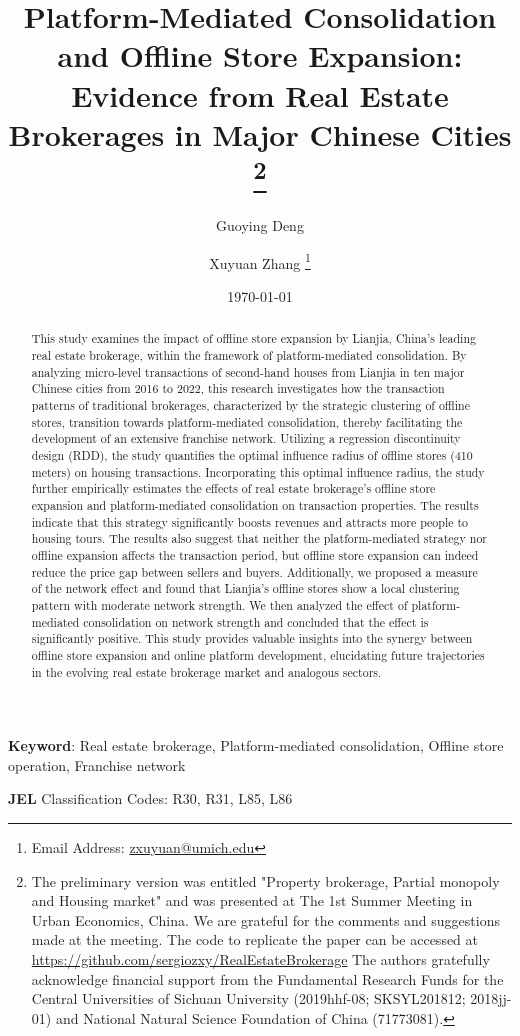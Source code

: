\documentclass[11pt]{article}
\title{ \vspace*{-2.5cm} \hspace*{-0.5cm}Platform-Mediated Consolidation and Offline Store Expansion: Evidence from Real Estate Brokerages in Major Chinese Cities \footnote{
The preliminary version was entitled "Property brokerage, Partial monopoly and Housing market" and was presented at The 1st Summer Meeting in Urban Economics, China. We are grateful for the comments and suggestions made at the meeting. The code to replicate the paper can be accessed at \href{https://github.com/sergiozxy/RealEstateBrokerage}{https://github.com/sergiozxy/RealEstateBrokerage} The authors gratefully acknowledge financial support from the Fundamental Research Funds for the Central Universities of Sichuan University (2019hhf-08; SKSYL201812; 2018jj-01) and National Natural Science Foundation of China (71773081). %
}}
\date{ \vspace*{0.5cm} \today}
\begin{document}
\author[1]{Guoying Deng}
\author[2]{Xuyuan Zhang \thanks{Email Address: \href{mailto:zxuyuan@umich.edu}{zxuyuan@umich.edu}}}

\bgroup
\let\footnoterule\relax

\begin{singlespace}
\maketitle

\begin{abstract}
    \noindent This study examines the impact of offline store expansion by Lianjia, China's leading real estate brokerage, within the framework of platform-mediated consolidation. By analyzing micro-level transactions of second-hand houses from Lianjia in ten major Chinese cities from 2016 to 2022, this research investigates how the transaction patterns of traditional brokerages, characterized by the strategic clustering of offline stores, transition towards platform-mediated consolidation, thereby facilitating the development of an extensive franchise network. Utilizing a regression discontinuity design (RDD), the study quantifies the optimal influence radius of offline stores (410 meters) on housing transactions. Incorporating this optimal influence radius, the study further empirically estimates the effects of real estate brokerage's offline store expansion and platform-mediated consolidation on transaction properties. The results indicate that this strategy significantly boosts revenues and attracts more people to housing tours. The results also suggest that neither the platform-mediated strategy nor offline expansion affects the transaction period, but offline store expansion can indeed reduce the price gap between sellers and buyers. Additionally, we proposed a measure of the network effect and found that Lianjia's offline stores show a local clustering pattern with moderate network strength. We then analyzed the effect of platform-mediated consolidation on network strength and concluded that the effect is significantly positive. This study provides valuable insights into the synergy between offline store expansion and online platform development, elucidating future trajectories in the evolving real estate brokerage market and analogous sectors.
  \end{abstract}
  
  \textbf{Keyword}: Real estate brokerage, Platform-mediated consolidation, Offline store operation, Franchise network
  
  \textbf{JEL} Classification Codes: R30, R31, L85, L86
\end{singlespace}
\thispagestyle{empty}
\end{document}
